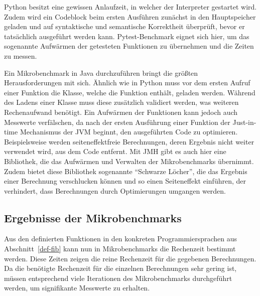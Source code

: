 \documentclass[11pt, parskip=half]{scrartcl}       %
\begin{document}
Python besitzt eine gewissen Anlaufzeit, in welcher der Interpreter gestartet wird.
Zudem wird ein Codeblock beim ersten Ausführen zunächst in den Hauptspeicher geladen und auf syntaktische und semantische Korrektheit überprüft, bevor er tatsächlich ausgeführt werden kann.
Pytest-Benchmark\cite{pytest_benchmark} eignet sich hier, um das sogenannte Aufwärmen der getesteten Funktionen zu übernehmen und die Zeiten zu messen.

Ein Mikrobenchmark in Java durchzuführen bringt die größten Herausforderungen mit sich.\cite{oracle_avoiding_benchmarking_pitfalls}
Ähnlich wie in Python muss vor dem ersten Aufruf einer Funktion die Klasse, welche die Funktion enthält, geladen werden.
Während des Ladens einer Klasse muss diese zusätzlich validiert werden, was weiteren Rechenaufwand benötigt.
Ein Aufwärmen der Funktionen kann jedoch auch Messwerte verfälschen, da nach der ersten Ausführung einer Funktion der Just-in-time Mechanismus der JVM beginnt, den ausgeführten Code zu optimieren.
Beispielsweise werden seiteneffektfreie Berechnungen, deren Ergebnis nicht weiter verwendet wird, aus dem Code entfernt.
Mit JMH\cite{openjdk_jmh} gibt es auch hier eine Bibliothek, die das Aufwärmen und Verwalten der Mikrobenchmarks übernimmt.
Zudem bietet diese Bibliothek sogenannte ``Schwarze Löcher'', die das Ergebnis einer Berechnung verschlucken können und so einen Seiteneffekt einführen, der verhindert, dass Berechnungen durch Optimierungen umgangen werden.

\subsection{Ergebnisse der Mikrobenchmarks}

Aus den definierten Funktionen in den konkreten Programmiersprachen aus Abschnitt~\ref{def-fib} kann nun in Mikrobenchmarks die Rechenzeit bestimmt werden.
Diese Zeiten zeigen die reine Rechenzeit für die gegebenen Berechnungen.
Da die benötigte Rechenzeit für die einzelnen Berechnungen sehr gering ist, müssen entsprechend viele Iterationen des Mikrobenchmarks durchgeführt werden, um signifikante Messwerte zu erhalten.
\end{document}
